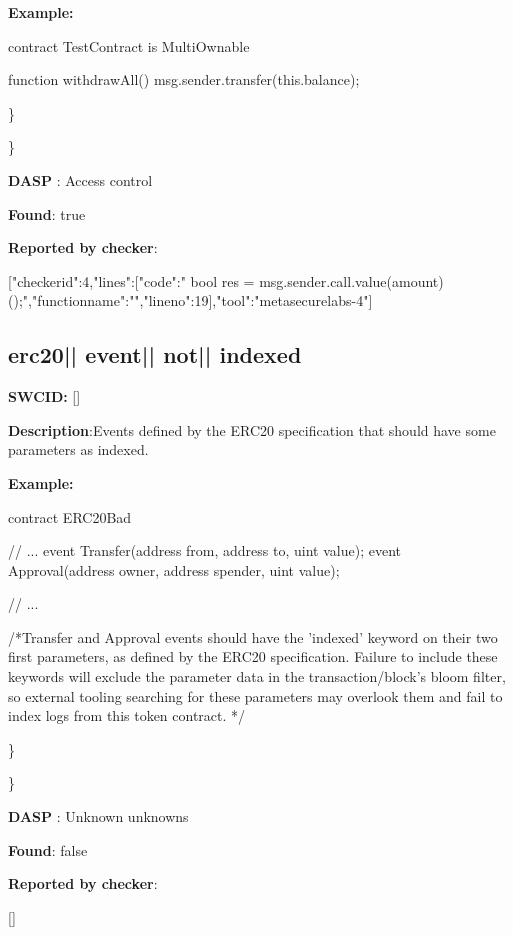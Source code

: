 \documentclass{article}
\begin{document}
\textbf{Example:} 
\begin{ffcode} 

contract TestContract is MultiOwnable {

  function withdrawAll(){
    msg.sender.transfer(this.balance);
  }
}

\end{ffcode} 
\} 

\} 

\textbf{DASP} : Access control

\textbf{Found}: true

\textbf{Reported by checker}: 
\begin{ffcode} 

[{"checker\textunderscore id":4,"lines":[{"code":"      bool res = msg.sender.call.value(amount)();\n","function\textunderscore name":"","line\textunderscore no":19}],"tool":"metasecurelabs-4"}]
\end{ffcode} 
\subsection{erc20{|\textunderscore| }event{|\textunderscore| }not{|\textunderscore| }indexed} 
\textbf{SWC{\textunderscore }ID:} []

\textbf{Description}:Events defined by the ERC20 specification that should have some parameters as indexed.


\textbf{Example:} 
\begin{ffcode} 

contract ERC20Bad {
    // ...
    event Transfer(address from, address to, uint value);
    event Approval(address owner, address spender, uint value);

    // ...
}

 /*Transfer and Approval events should have the 'indexed' keyword on their two first parameters, as defined by the ERC20 specification. Failure to include these keywords will exclude the parameter data in the transaction/block's bloom filter, so external tooling searching for these parameters may overlook them and fail to index logs from this token contract. */ 

\end{ffcode} 
\} 

\} 

\textbf{DASP} : Unknown unknowns

\textbf{Found}: false

\textbf{Reported by checker}: 
\begin{ffcode} 

[]
\end{ffcode} 
\end{document}
